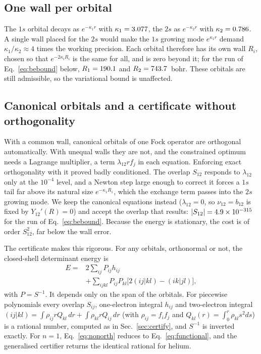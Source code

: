 \documentclass[aps,pra,reprint,superscriptaddress,amsmath,amssymb,longbibliography]{revtex4-2}
\begin{document}
\subsection{One wall per orbital}

The $1s$ orbital decays as $e^{-\kappa_1r}$ with $\kappa_1=3.077$, the $2s$ as $e^{-\kappa_2r}$ with $\kappa_2=0.786$. A single wall placed for the $2s$ would make the $1s$ growing mode $e^{\kappa_1r}$ demand $\kappa_1/\kappa_2\approx4$ times the working precision. Each orbital therefore has its own wall $R_i$, chosen so that $e^{-2\kappa_iR_i}$ is the same for all, and is zero beyond it; for the run of Eq.~\eqref{eq:bebound} below, $R_1=190.1$ and $R_2=743.7$~bohr. These orbitals are still admissible, so the variational bound is unaffected.

\subsection{Canonical orbitals and a certificate without orthogonality}

With a common wall, canonical orbitals of one Fock operator are orthogonal automatically. With unequal walls they are not, and the constrained optimum needs a Lagrange multiplier, a term $\lambda_{12}rf_j$ in each equation. Enforcing exact orthogonality with it proved badly conditioned. The overlap $S_{12}$ responds to $\lambda_{12}$ only at the $10^{-4}$ level, and a Newton step large enough to correct it forces a $1s$ tail far above its natural size $e^{-\kappa_1R_1}$, which the exchange term passes into the $2s$ growing mode. We keep the canonical equations instead ($\lambda_{12}=0$, so $\nu_{12}=b_{12}$ is fixed by $Y_{12}'(R)=0$) and accept the overlap that results: $|S_{12}|=4.9\times10^{-315}$ for the run of Eq.~\eqref{eq:bebound}. Because the energy is stationary, the cost is of order $S_{12}^2$, far below the wall error.

The certificate makes this rigorous. For any orbitals, orthonormal or not, the closed-shell determinant energy is
\begin{equation}
\begin{split}
E={}&2\sum_{ij}P_{ij}h_{ij}\\
&+\sum_{ijkl}P_{ij}P_{kl}\big[2(ij|kl)-(ik|jl)\big],
\end{split}\label{eq:nonorth}
\end{equation}
with $P=S^{-1}$. It depends only on the span of the orbitals. For piecewise polynomials every overlap $S_{ij}$, one-electron integral $h_{ij}$ and two-electron integral $(ij|kl)=\int\rho_{ij}rQ_{kl}\,dr+\int\rho_{kl}rQ_{ij}\,dr$ (with $\rho_{ij}=f_if_j$ and $Q_{kl}(r)=\int_0^r\rho_{kl}s^2ds$) is a rational number, computed as in Sec.~\ref{sec:certify}, and $S^{-1}$ is inverted exactly. For $n=1$, Eq.~\eqref{eq:nonorth} reduces to Eq.~\eqref{eq:functional}, and the generalised certifier returns the identical rational for helium.
\end{document}

